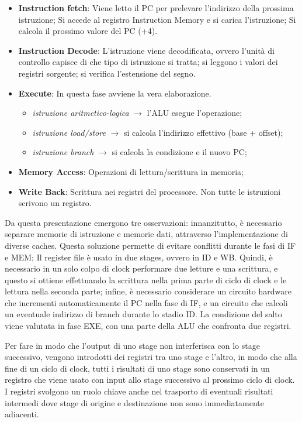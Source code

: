 \begin{itemize}
    \item \textbf{Instruction fetch}: Viene letto il PC per prelevare l'indirizzo della prossima istruzione; Si accede al registro Instruction Memory e si carica l'istruzione; Si calcola il prossimo valore del PC (+4).
    \item \textbf{Instruction Decode}: L'istruzione viene decodificata, ovvero l'unità di controllo capisce di che tipo di istruzione si tratta; si leggono i valori dei registri sorgente; si verifica l'estensione del segno. 
    \item \textbf{Execute}: In questa fase avviene la vera elaborazione. 
    \begin{itemize}
        \item \textit{istruzione aritmetico-logica} $\rightarrow$ l'ALU esegue l'operazione;
        \item \textit{istruzione load/store} $\rightarrow$ si calcola l'indirizzo effettivo (base + offset);
        \item \textit{istruzione branch} $\rightarrow$ si calcola la condizione e il nuovo PC;
    \end{itemize}
    \item \textbf{Memory Access}: Operazioni di lettura/scrittura in memoria;
    \item \textbf{Write Back}: Scrittura nei registri del processore. Non tutte le istruzioni scrivono un registro. 
\end{itemize}

Da questa presentazione emergono tre osservazioni: innanzitutto, è necessario separare memorie di istruzione e memorie dati, attraverso l'implementazione di diverse caches. Questa soluzione permette di evitare conflitti durante le fasi di IF e MEM; Il register file è usato in due stages, ovvero in ID e WB. Quindi, è necessario in un solo colpo di clock performare due letture e una scrittura, e questo si ottiene effettuando la scrittura nella prima parte di ciclo di clock e le lettura nella seconda parte; infine, è necessario considerare un circuito hardware che incrementi automaticamente il PC nella fase di IF, e un circuito che calcoli un eventuale indirizzo di branch durante lo stadio ID. La condizione del salto viene valutata in fase EXE, con una parte della ALU che confronta due registri. 

\noindent Per fare in modo che l'output di uno stage non interferisca con lo stage successivo, vengono introdotti dei registri tra uno stage e l'altro, in modo che alla fine di un ciclo di clock, tutti i risultati di uno stage sono conservati in un registro che viene usato con input allo stage successivo al prossimo ciclo di clock. I registri svolgono un ruolo chiave anche nel trasporto di eventuali risultati intermedi dove stage di origine e destinazione non sono immediatamente adiacenti. 

